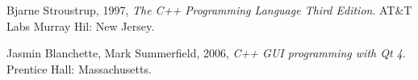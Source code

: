 
\begin{thebibliography}{9}

           Bjarne Stroustrup, 1997,
          \emph{The C++ Programming Language Third Edition}.
          AT\&T Labs Murray Hil:
          New Jersey.

           Jasmin Blanchette, Mark Summerfield, 2006,
          \emph{C++ GUI programming with Qt 4}.
          Prentice Hall:
          Massachusetts.

\end{thebibliography}
